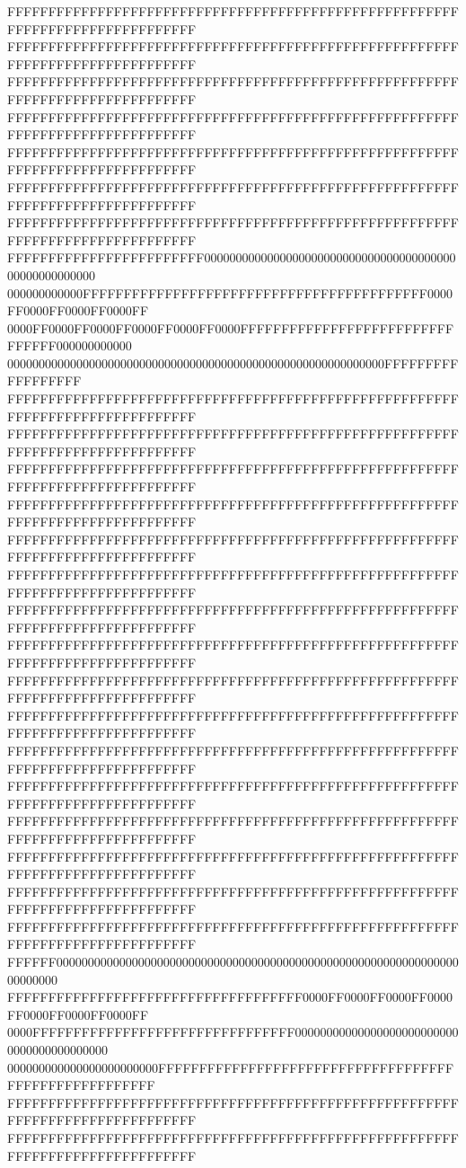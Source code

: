 FFFFFFFFFFFFFFFFFFFFFFFFFFFFFFFFFFFFFFFFFFFFFFFFFFFFFFFFFFFFFFFFFFFFFFFFFFFFFF
FFFFFFFFFFFFFFFFFFFFFFFFFFFFFFFFFFFFFFFFFFFFFFFFFFFFFFFFFFFFFFFFFFFFFFFFFFFFFF
FFFFFFFFFFFFFFFFFFFFFFFFFFFFFFFFFFFFFFFFFFFFFFFFFFFFFFFFFFFFFFFFFFFFFFFFFFFFFF
FFFFFFFFFFFFFFFFFFFFFFFFFFFFFFFFFFFFFFFFFFFFFFFFFFFFFFFFFFFFFFFFFFFFFFFFFFFFFF
FFFFFFFFFFFFFFFFFFFFFFFFFFFFFFFFFFFFFFFFFFFFFFFFFFFFFFFFFFFFFFFFFFFFFFFFFFFFFF
FFFFFFFFFFFFFFFFFFFFFFFFFFFFFFFFFFFFFFFFFFFFFFFFFFFFFFFFFFFFFFFFFFFFFFFFFFFFFF
FFFFFFFFFFFFFFFFFFFFFFFFFFFFFFFFFFFFFFFFFFFFFFFFFFFFFFFFFFFFFFFFFFFFFFFFFFFFFF
FFFFFFFFFFFFFFFFFFFFFFFF000000000000000000000000000000000000000000000000000000
000000000000FFFFFFFFFFFFFFFFFFFFFFFFFFFFFFFFFFFFFFFFFF0000FF0000FF0000FF0000FF
0000FF0000FF0000FF0000FF0000FF0000FFFFFFFFFFFFFFFFFFFFFFFFFFFFFFFF000000000000
000000000000000000000000000000000000000000000000000000000000FFFFFFFFFFFFFFFFFF
FFFFFFFFFFFFFFFFFFFFFFFFFFFFFFFFFFFFFFFFFFFFFFFFFFFFFFFFFFFFFFFFFFFFFFFFFFFFFF
FFFFFFFFFFFFFFFFFFFFFFFFFFFFFFFFFFFFFFFFFFFFFFFFFFFFFFFFFFFFFFFFFFFFFFFFFFFFFF
FFFFFFFFFFFFFFFFFFFFFFFFFFFFFFFFFFFFFFFFFFFFFFFFFFFFFFFFFFFFFFFFFFFFFFFFFFFFFF
FFFFFFFFFFFFFFFFFFFFFFFFFFFFFFFFFFFFFFFFFFFFFFFFFFFFFFFFFFFFFFFFFFFFFFFFFFFFFF
FFFFFFFFFFFFFFFFFFFFFFFFFFFFFFFFFFFFFFFFFFFFFFFFFFFFFFFFFFFFFFFFFFFFFFFFFFFFFF
FFFFFFFFFFFFFFFFFFFFFFFFFFFFFFFFFFFFFFFFFFFFFFFFFFFFFFFFFFFFFFFFFFFFFFFFFFFFFF
FFFFFFFFFFFFFFFFFFFFFFFFFFFFFFFFFFFFFFFFFFFFFFFFFFFFFFFFFFFFFFFFFFFFFFFFFFFFFF
FFFFFFFFFFFFFFFFFFFFFFFFFFFFFFFFFFFFFFFFFFFFFFFFFFFFFFFFFFFFFFFFFFFFFFFFFFFFFF
FFFFFFFFFFFFFFFFFFFFFFFFFFFFFFFFFFFFFFFFFFFFFFFFFFFFFFFFFFFFFFFFFFFFFFFFFFFFFF
FFFFFFFFFFFFFFFFFFFFFFFFFFFFFFFFFFFFFFFFFFFFFFFFFFFFFFFFFFFFFFFFFFFFFFFFFFFFFF
FFFFFFFFFFFFFFFFFFFFFFFFFFFFFFFFFFFFFFFFFFFFFFFFFFFFFFFFFFFFFFFFFFFFFFFFFFFFFF
FFFFFFFFFFFFFFFFFFFFFFFFFFFFFFFFFFFFFFFFFFFFFFFFFFFFFFFFFFFFFFFFFFFFFFFFFFFFFF
FFFFFFFFFFFFFFFFFFFFFFFFFFFFFFFFFFFFFFFFFFFFFFFFFFFFFFFFFFFFFFFFFFFFFFFFFFFFFF
FFFFFFFFFFFFFFFFFFFFFFFFFFFFFFFFFFFFFFFFFFFFFFFFFFFFFFFFFFFFFFFFFFFFFFFFFFFFFF
FFFFFFFFFFFFFFFFFFFFFFFFFFFFFFFFFFFFFFFFFFFFFFFFFFFFFFFFFFFFFFFFFFFFFFFFFFFFFF
FFFFFFFFFFFFFFFFFFFFFFFFFFFFFFFFFFFFFFFFFFFFFFFFFFFFFFFFFFFFFFFFFFFFFFFFFFFFFF
FFFFFF000000000000000000000000000000000000000000000000000000000000000000000000
FFFFFFFFFFFFFFFFFFFFFFFFFFFFFFFFFFFF0000FF0000FF0000FF0000FF0000FF0000FF0000FF
0000FFFFFFFFFFFFFFFFFFFFFFFFFFFFFFFF000000000000000000000000000000000000000000
000000000000000000000000FFFFFFFFFFFFFFFFFFFFFFFFFFFFFFFFFFFFFFFFFFFFFFFFFFFFFF
FFFFFFFFFFFFFFFFFFFFFFFFFFFFFFFFFFFFFFFFFFFFFFFFFFFFFFFFFFFFFFFFFFFFFFFFFFFFFF
FFFFFFFFFFFFFFFFFFFFFFFFFFFFFFFFFFFFFFFFFFFFFFFFFFFFFFFFFFFFFFFFFFFFFFFFFFFFFF
